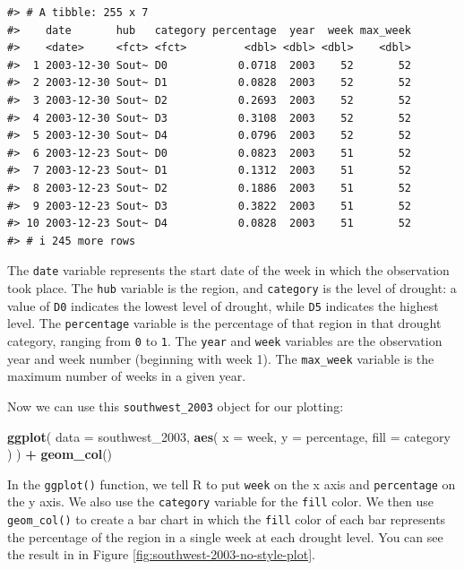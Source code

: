 \documentclass[
]{book}
\newenvironment{Shaded}{\begin{snugshade}}{\end{snugshade}}
\newcommand{\AttributeTok}[1]{\textcolor[rgb]{0.13,0.29,0.53}{#1}}
\newcommand{\FunctionTok}[1]{\textcolor[rgb]{0.13,0.29,0.53}{\textbf{#1}}}
\newcommand{\NormalTok}[1]{#1}
\newcommand{\SpecialCharTok}[1]{\textcolor[rgb]{0.81,0.36,0.00}{\textbf{#1}}}
\begin{document}
\begin{verbatim}
#> # A tibble: 255 x 7
#>    date       hub   category percentage  year  week max_week
#>    <date>     <fct> <fct>         <dbl> <dbl> <dbl>    <dbl>
#>  1 2003-12-30 Sout~ D0           0.0718  2003    52       52
#>  2 2003-12-30 Sout~ D1           0.0828  2003    52       52
#>  3 2003-12-30 Sout~ D2           0.2693  2003    52       52
#>  4 2003-12-30 Sout~ D3           0.3108  2003    52       52
#>  5 2003-12-30 Sout~ D4           0.0796  2003    52       52
#>  6 2003-12-23 Sout~ D0           0.0823  2003    51       52
#>  7 2003-12-23 Sout~ D1           0.1312  2003    51       52
#>  8 2003-12-23 Sout~ D2           0.1886  2003    51       52
#>  9 2003-12-23 Sout~ D3           0.3822  2003    51       52
#> 10 2003-12-23 Sout~ D4           0.0828  2003    51       52
#> # i 245 more rows
\end{verbatim}

The \texttt{date} variable represents the start date of the week in which the observation took place. The \texttt{hub} variable is the region, and \texttt{category} is the level of drought: a value of \texttt{D0} indicates the lowest level of drought, while \texttt{D5} indicates the highest level. The \texttt{percentage} variable is the percentage of that region in that drought category, ranging from \texttt{0} to \texttt{1}. The \texttt{year} and \texttt{week} variables are the observation year and week number (beginning with week 1). The \texttt{max\_week} variable is the maximum number of weeks in a given year.

Now we can use this \texttt{southwest\_2003} object for our plotting:

\begin{Shaded}
\begin{Highlighting}[]
\FunctionTok{ggplot}\NormalTok{(}
  \AttributeTok{data =}\NormalTok{ southwest\_2003,}
  \FunctionTok{aes}\NormalTok{(}
    \AttributeTok{x =}\NormalTok{ week,}
    \AttributeTok{y =}\NormalTok{ percentage,}
    \AttributeTok{fill =}\NormalTok{ category}
\NormalTok{  )}
\NormalTok{) }\SpecialCharTok{+}
  \FunctionTok{geom\_col}\NormalTok{()}
\end{Highlighting}
\end{Shaded}

In the \texttt{ggplot()} function, we tell R to put \texttt{week} on the x axis and \texttt{percentage} on the y axis. We also use the \texttt{category} variable for the \texttt{fill} color. We then use \texttt{geom\_col()} to create a bar chart in which the \texttt{fill} color of each bar represents the percentage of the region in a single week at each drought level. You can see the result in in Figure \ref{fig:southwest-2003-no-style-plot}.
\end{document}
